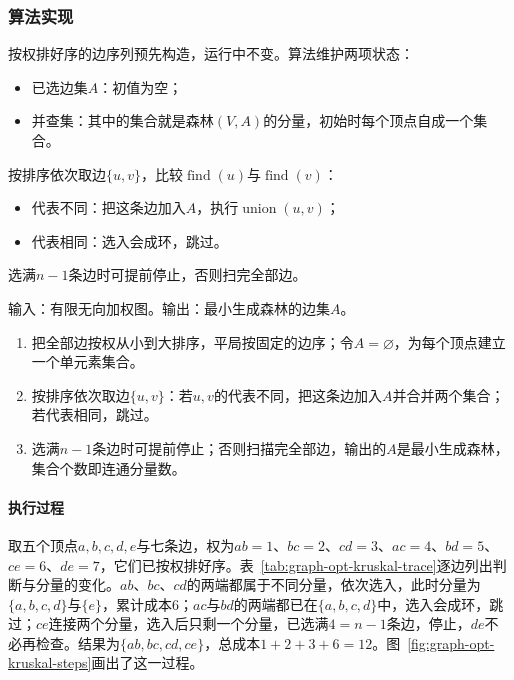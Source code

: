 \subsubsection{算法实现}

按权排好序的边序列预先构造，运行中不变。算法维护两项状态：
\begin{itemize}
  \item 已选边集$A$：初值为空；
  \item 并查集：其中的集合就是森林$(V,A)$的分量，初始时每个顶点自成一个集合。
\end{itemize}
按排序依次取边$\{u,v\}$，比较$\operatorname{find}(u)$与$\operatorname{find}(v)$：
\begin{itemize}
  \item 代表不同：把这条边加入$A$，执行$\operatorname{union}(u,v)$；
  \item 代表相同：选入会成环，跳过。
\end{itemize}
选满$n-1$条边时可提前停止，否则扫完全部边。

\begin{algorithm}[Kruskal算法]
\label{alg:graph-opt-kruskal}
输入：有限无向加权图。输出：最小生成森林的边集$A$。
\begin{enumerate}
  \item 把全部边按权从小到大排序，平局按固定的边序；令$A=\varnothing$，为每个顶点建立一个单元素集合。
  \item 按排序依次取边$\{u,v\}$：若$u,v$的代表不同，把这条边加入$A$并合并两个集合；若代表相同，跳过。
  \item 选满$n-1$条边时可提前停止；否则扫描完全部边，输出的$A$是最小生成森林，集合个数即连通分量数。
\end{enumerate}
\end{algorithm}

\paragraph{执行过程}
取五个顶点$a,b,c,d,e$与七条边，权为$ab=1$、$bc=2$、$cd=3$、$ac=4$、$bd=5$、$ce=6$、$de=7$，它们已按权排好序。表~\ref{tab:graph-opt-kruskal-trace}逐边列出判断与分量的变化。$ab$、$bc$、$cd$的两端都属于不同分量，依次选入，此时分量为$\{a,b,c,d\}$与$\{e\}$，累计成本$6$；$ac$与$bd$的两端都已在$\{a,b,c,d\}$中，选入会成环，跳过；$ce$连接两个分量，选入后只剩一个分量，已选满$4=n-1$条边，停止，$de$不必再检查。结果为$\{ab,bc,cd,ce\}$，总成本$1+2+3+6=12$。图~\ref{fig:graph-opt-kruskal-steps}画出了这一过程。

